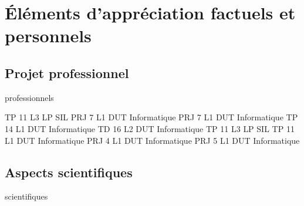\chapter{Éléments d'appréciation factuels et personnels}
  \section{Projet professionnel}
    \begin{modules}{professionnels}
    \end{modules}

    \begin{enseignements}
                   {TP}
                   {11} %
                   {L3}
                   {LP SIL}
                   {PRJ}
                   {7} %
                   {L1}
                   {DUT Informatique}
                   {PRJ}
                   {7} %
                   {L1}
                   {DUT Informatique}
                   {TP}
                   {14} %
                   {L1}
                   {DUT Informatique}
                   {TD}
                   {16} %
                   {L2}
                   {DUT Informatique}
                   {TP}
                   {11} %
                   {L3}
                   {LP SIL}
                   {TP}
                   {11} %
                   {L1}
                   {DUT Informatique}
                   {PRJ}
                   {4} %
                   {L1}
                   {DUT Informatique}
                   {PRJ}
                   {5} %
                   {L1}
                   {DUT Informatique}
    \end{enseignements}

  \section{Aspects scientifiques}
    \begin{modules}{scientifiques}
    \end{modules}

